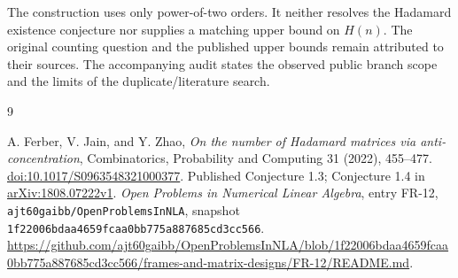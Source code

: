 \documentclass[11pt,a4paper]{article}
\begin{document}
The construction uses only power-of-two orders. It neither resolves the
Hadamard existence conjecture nor supplies a matching upper bound on $H(n)$.
The original counting question and the published upper bounds remain
attributed to their sources. The accompanying audit states the observed
public branch scope and the limits of the duplicate/literature search.

\begin{thebibliography}{9}\raggedright
{}
A. Ferber, V. Jain, and Y. Zhao,
\emph{On the number of Hadamard matrices via anti-concentration},
Combinatorics, Probability and Computing 31 (2022), 455--477.
\href{https://doi.org/10.1017/S0963548321000377}{doi:10.1017/S0963548321000377}.
Published Conjecture 1.3; Conjecture 1.4 in
\href{https://arxiv.org/abs/1808.07222}{arXiv:1808.07222v1}.
\emph{Open Problems in Numerical Linear Algebra}, entry FR-12,
\texttt{ajt60gaibb/OpenProblemsInNLA}, snapshot
\texttt{1f22006bdaa4659fcaa0bb775a887685cd3cc566}.
\url{https://github.com/ajt60gaibb/OpenProblemsInNLA/blob/1f22006bdaa4659fcaa0bb775a887685cd3cc566/frames-and-matrix-designs/FR-12/README.md}.
\end{thebibliography}
\end{document}
